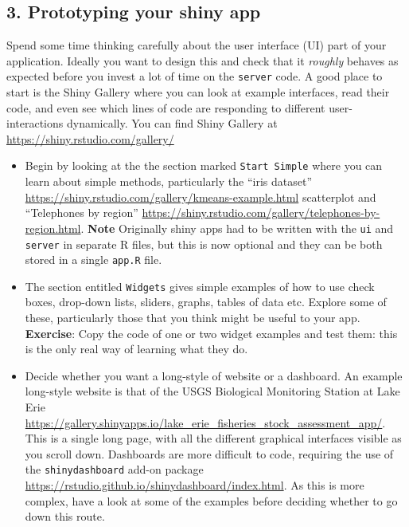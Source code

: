 \documentclass[]{article}
\begin{document}
\subsection{3. Prototyping your shiny
app}\label{prototyping-your-shiny-app}

Spend some time thinking carefully about the user interface (UI) part of
your application. Ideally you want to design this and check that it
\emph{roughly} behaves as expected before you invest a lot of time on
the \texttt{server} code. A good place to start is the Shiny Gallery
where you can look at example interfaces, read their code, and even see
which lines of code are responding to different user-interactions
dynamically. You can find Shiny Gallery at
\url{https://shiny.rstudio.com/gallery/}

\begin{itemize}
\item
  Begin by looking at the the section marked \texttt{Start\ Simple}
  where you can learn about simple methods, particularly the ``iris
  dataset'' \url{https://shiny.rstudio.com/gallery/kmeans-example.html}
  scatterplot and ``Telephones by region''
  \url{https://shiny.rstudio.com/gallery/telephones-by-region.html}.
  \textbf{Note} Originally shiny apps had to be written with the
  \texttt{ui} and \texttt{server} in separate R files, but this is now
  optional and they can be both stored in a single \texttt{app.R} file.
\item
  The section entitled \texttt{Widgets} gives simple examples of how to
  use check boxes, drop-down lists, sliders, graphs, tables of data etc.
  Explore some of these, particularly those that you think might be
  useful to your app. \textbf{Exercise}: Copy the code of one or two
  widget examples and test them: this is the only real way of learning
  what they do.
\item
  Decide whether you want a long-style of website or a dashboard. An
  example long-style website is that of the USGS Biological Monitoring
  Station at Lake Erie
  \url{https://gallery.shinyapps.io/lake_erie_fisheries_stock_assessment_app/}.
  This is a single long page, with all the different graphical
  interfaces visible as you scroll down. Dashboards are more difficult
  to code, requiring the use of the \texttt{shinydashboard} add-on
  package \url{https://rstudio.github.io/shinydashboard/index.html}. As
  this is more complex, have a look at some of the examples before
  deciding whether to go down this route.
\end{itemize}
\end{document}

